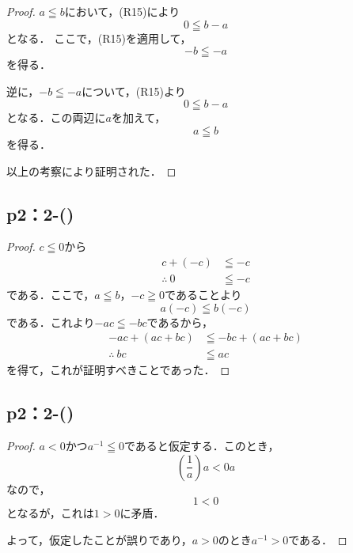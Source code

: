 \begin{leftbar}
    \begin{proof}
        $a \leqq b$において，(R15)により
        \[
            0 \leqq b-a
        \]
        となる．
        ここで，(R15)を適用して，
        \[
            -b \leqq -a
        \]
        を得る．

        逆に，$-b\leqq -a$について，(R15)より
        \[
            0 \leqq b -a
        \]
        となる．この両辺に$a$を加えて，
        \[
            a \leqq b
        \]
        を得る．

        以上の考察により証明された．
    \end{proof}
\end{leftbar}

\newpage

\subsection*{p2：2-()}

\begin{leftbar}
    \begin{proof}
        $c \leqq 0$から
        \begin{align*}
            c+(-c)         & \leqq -c \\
            \therefore ~ 0 & \leqq -c
        \end{align*}
        である．ここで，$a \leqq b$，$-c \geqq 0$であることより
        \[
            a(-c) \leqq b (-c)
        \]
        である．これより$ -ac \leqq -bc$であるから，
        \begin{align*}
            -ac + (ac+bc)   & \leqq -bc +(ac+bc) \\
            \therefore ~ bc & \leqq ac
        \end{align*}
        を得て，これが証明すべきことであった．
    \end{proof}
\end{leftbar}

\subsection*{p2：2-()}

\begin{leftbar}
    \begin{proof}
        $a<0$かつ$a^{-1} \leqq 0$であると仮定する．このとき，
        \[
            \left( \frac{1}{a} \right) a < 0a
        \]
        なので，
        \[
            1<0
        \]
        となるが，これは$1>0$に矛盾．

        よって，仮定したことが誤りであり，$a>0$のとき$a^{-1} >0$である．
    \end{proof}
\end{leftbar}

